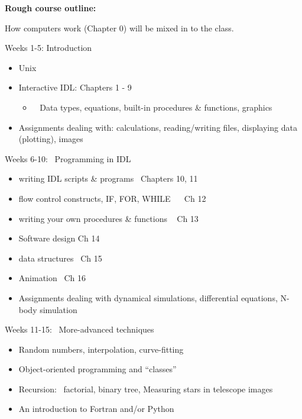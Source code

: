 \documentclass[]{article}
\begin{document}
\textbf{Rough course outline:}

How computers work (Chapter 0) will be mixed in to the class. 

Weeks 1-5: Introduction

\begin{itemize}
    \item Unix
    \item Interactive IDL:  Chapters 1 - 9
        \begin{itemize}
            \item ~ Data types, equations, built-in procedures \& functions, graphics
        \end{itemize}
    \item Assignments dealing with: calculations, reading/writing files,
displaying data (plotting), images
\end{itemize}


Weeks 6-10:~ Programming in IDL~

\begin{itemize}
\item writing IDL scripts \& programs~ Chapters 10, 11

\item flow control constructs, IF, FOR, WHILE~ ~ Ch 12

\item writing your own procedures \& functions ~ Ch 13

\item Software design Ch 14

\item data structures~ Ch 15

\item Animation~ Ch 16

\item Assignments dealing with dynamical simulations, differential
equations, N-body simulation
\end{itemize}




Weeks 11-15:~ More-advanced techniques

\begin{itemize}
\item Random numbers, interpolation, curve-fitting

\item Object-oriented programming and ``classes''

\item Recursion:~ factorial, binary tree, Measuring stars in telescope
images

\item An introduction to Fortran and/or Python
\end{itemize}
\end{document}
